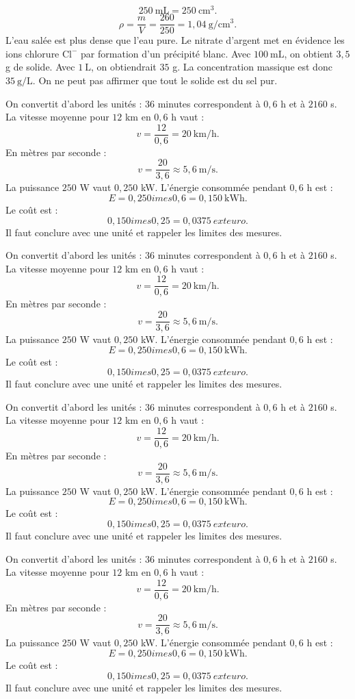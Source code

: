 \documentclass[11pt,a4paper]{article}
\newcounter{correction}
\begin{document}
\begin{correction}[PC-LONG-02]
\[
250\ \mathrm{mL}=250\ \mathrm{cm^3}.
\]
\[
\rho=\frac{m}{V}=\frac{260}{250}=1{,}04\ \mathrm{g/cm^3}.
\]
L'eau salée est plus dense que l'eau pure. Le nitrate d'argent met en évidence les ions chlorure $\mathrm{Cl^-}$ par formation d'un précipité blanc. Avec $100\ \mathrm{mL}$, on obtient $3{,}5$ g de solide. Avec $1\ \mathrm{L}$, on obtiendrait $35$ g. La concentration massique est donc $35\ \mathrm{g/L}$. On ne peut pas affirmer que tout le solide est du sel pur.
\end{correction}
\begin{correction}
On convertit d'abord les unités : $36$ minutes correspondent à $0{,}6$ h et à $2160$ s. La vitesse moyenne pour $12$ km en $0{,}6$ h vaut :
\[
v=\frac{12}{0{,}6}=20\ \mathrm{km/h}.
\]
En mètres par seconde :
\[
v=\frac{20}{3{,}6}\approx5{,}6\ \mathrm{m/s}.
\]
La puissance $250$ W vaut $0{,}250$ kW. L'énergie consommée pendant $0{,}6$ h est :
\[
E=0{,}250	imes0{,}6=0{,}150\ \mathrm{kWh}.
\]
Le coût est :
\[
0{,}150	imes0{,}25=0{,}0375\ 	ext{euro}.
\]
Il faut conclure avec une unité et rappeler les limites des mesures.
\end{correction}
\begin{correction}
On convertit d'abord les unités : $36$ minutes correspondent à $0{,}6$ h et à $2160$ s. La vitesse moyenne pour $12$ km en $0{,}6$ h vaut :
\[
v=\frac{12}{0{,}6}=20\ \mathrm{km/h}.
\]
En mètres par seconde :
\[
v=\frac{20}{3{,}6}\approx5{,}6\ \mathrm{m/s}.
\]
La puissance $250$ W vaut $0{,}250$ kW. L'énergie consommée pendant $0{,}6$ h est :
\[
E=0{,}250	imes0{,}6=0{,}150\ \mathrm{kWh}.
\]
Le coût est :
\[
0{,}150	imes0{,}25=0{,}0375\ 	ext{euro}.
\]
Il faut conclure avec une unité et rappeler les limites des mesures.
\end{correction}
\begin{correction}
On convertit d'abord les unités : $36$ minutes correspondent à $0{,}6$ h et à $2160$ s. La vitesse moyenne pour $12$ km en $0{,}6$ h vaut :
\[
v=\frac{12}{0{,}6}=20\ \mathrm{km/h}.
\]
En mètres par seconde :
\[
v=\frac{20}{3{,}6}\approx5{,}6\ \mathrm{m/s}.
\]
La puissance $250$ W vaut $0{,}250$ kW. L'énergie consommée pendant $0{,}6$ h est :
\[
E=0{,}250	imes0{,}6=0{,}150\ \mathrm{kWh}.
\]
Le coût est :
\[
0{,}150	imes0{,}25=0{,}0375\ 	ext{euro}.
\]
Il faut conclure avec une unité et rappeler les limites des mesures.
\end{correction}
\begin{correction}
On convertit d'abord les unités : $36$ minutes correspondent à $0{,}6$ h et à $2160$ s. La vitesse moyenne pour $12$ km en $0{,}6$ h vaut :
\[
v=\frac{12}{0{,}6}=20\ \mathrm{km/h}.
\]
En mètres par seconde :
\[
v=\frac{20}{3{,}6}\approx5{,}6\ \mathrm{m/s}.
\]
La puissance $250$ W vaut $0{,}250$ kW. L'énergie consommée pendant $0{,}6$ h est :
\[
E=0{,}250	imes0{,}6=0{,}150\ \mathrm{kWh}.
\]
Le coût est :
\[
0{,}150	imes0{,}25=0{,}0375\ 	ext{euro}.
\]
Il faut conclure avec une unité et rappeler les limites des mesures.
\end{correction}
\newpage
\end{document}
